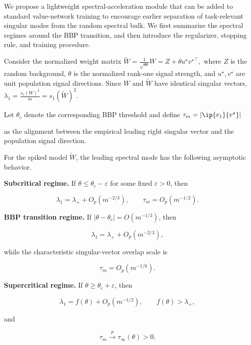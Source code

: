 We propose a lightweight spectral-acceleration module that can be added to
standard value-network training to encourage earlier separation of
task-relevant singular modes from the random spectral bulk. We first summarize
the spectral regimes around the BBP transition, and then introduce the
regularizer, stopping rule, and training procedure.

Consider the normalized weight matrix $\widetilde W
=
\frac{1}{\sqrt m}W
=
Z+\theta u^\star {v^\star}^{\top},
\label{eq:spiked_weight_main}$ where $Z$ is the random background,
$\theta$ is the normalized rank-one signal strength, and
$u^\star,v^\star$ are unit population signal directions.
Since $W$ and $\widetilde W$ have identical singular vectors, $\lambda_1
=
\frac{s_1(W)^2}{m}
=
s_1(\widetilde W)^2.$


Let $\theta_c$ denote the corresponding BBP threshold and define $\tau_m
=
\left|
\ip{v_1}{v^\star}
\right|$


as the alignment between the empirical leading right singular vector and
the population signal direction.

\begin{corollary}
\label{cor:three_regimes}
For the spiked model $\widetilde W$, the leading spectral
mode has the following asymptotic behavior.

\textbf{Subcritical regime.}
If $\theta\leq\theta_c-\varepsilon$ for some fixed $\varepsilon>0$, then

\begin{equation}
\lambda_1
=
\lambda_+
+
O_p(m^{-2/3}),
\qquad
\tau_m
=
O_p(m^{-1/2}).
\end{equation}

\textbf{BBP transition regime.}
If $|\theta-\theta_c|
=
O(m^{-1/3})$, then

\begin{equation}
\lambda_1
=
\lambda_+
+
O_p(m^{-2/3}),
\end{equation}

while the characteristic singular-vector overlap scale is

\begin{equation}
\tau_m
=
O_p(m^{-1/6}).
\end{equation}

\textbf{Supercritical regime.}
If $\theta\geq\theta_c+\varepsilon$, then

\begin{equation}
\lambda_1
=
f(\theta)
+
O_p(m^{-1/2}),
\qquad
f(\theta)>\lambda_+,
\end{equation}

and

\begin{equation}
\tau_m
\xrightarrow{p}
\tau_\infty(\theta)>0.
\end{equation}
\end{corollary}

